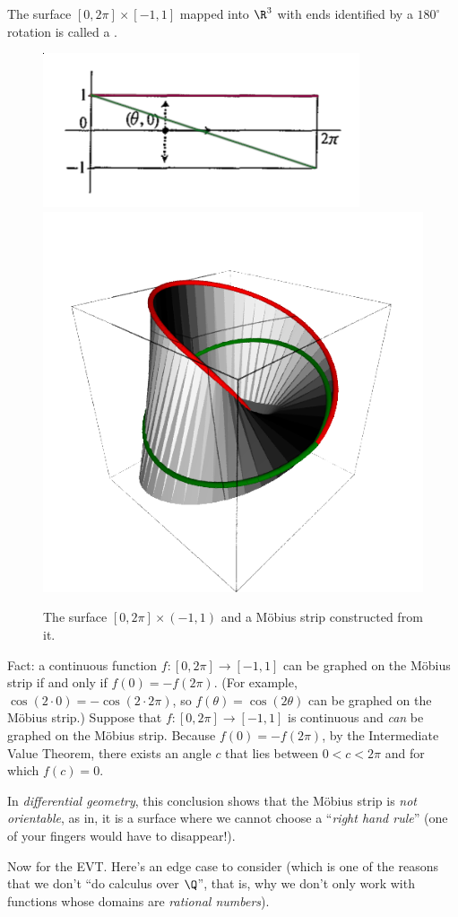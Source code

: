 \documentclass{ccg-topic}
\begin{document}
\begin{ex}
    \label{ex:the_mobius_strip_is_unorientable}
    The surface $[0,2\pi] \times [-1,1]$ mapped into $\R^3$ with ends identified by a $180^\circ$ rotation is called a .

    \begin{figure}[htpb]
        \includegraphics[width=0.55\linewidth]{images/moebius-unwound.png}
        \includegraphics[width=0.3\linewidth]{images/moebius.png}
        \caption{The surface $[0, 2\pi]\times (-1,1)$ and a Möbius strip constructed from it.}
        \label{fig:images/moebius-unwound}
    \end{figure}
    Fact: a continuous function $f \colon [0, 2\pi] \to [-1,1]$ can be graphed on the Möbius strip if and only if $f(0) = -f(2\pi)$. (For example, $\cos(2\cdot 0) = - \cos (2\cdot 2\pi)$, so $f(\theta) = \cos(2\theta)$ can be graphed on the Möbius strip.) Suppose that $f \colon [0, 2\pi] \to [-1,1]$ is continuous and \emph{can} be graphed on the Möbius strip. Because $f(0) = - f(2\pi)$, by the Intermediate Value Theorem, there exists an angle $c$ that lies between $0 < c < 2\pi$ and for which $f(c) = 0$. 
   
    In \emph{differential geometry}, this conclusion shows that the Möbius strip is \emph{not orientable}, as in, it is a surface where we cannot choose a ``\emph{right hand rule}'' (one of your fingers would have to disappear!).
\end{ex}

Now for the EVT. Here's an edge case to consider (which is one of the reasons that we don't ``do calculus over $\Q$'', that is, why we don't only work with functions whose domains are \emph{rational numbers}).
\end{document}
